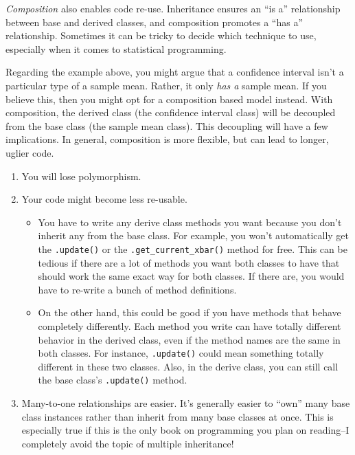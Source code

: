 \documentclass[12pt,krantz2]{krantz}
\begin{document}
\emph{Composition} also enables code re-use. Inheritance ensures an ``is a'' relationship between base and derived classes, and composition promotes a ``has a'' relationship. Sometimes it can be tricky to decide which technique to use, especially when it comes to statistical programming.

Regarding the example above, you might argue that a confidence interval isn't a particular type of a sample mean. Rather, it only \emph{has a} sample mean. If you believe this, then you might opt for a composition based model instead. With composition, the derived class (the confidence interval class) will be decoupled from the base class (the sample mean class). This decoupling will have a few implications. In general, composition is more flexible, but can lead to longer, uglier code.

\begin{enumerate}
\def\labelenumi{\arabic{enumi}.}
\item
  You will lose polymorphism.
\item
  Your code might become less re-usable.

  \begin{itemize}
  \item
    You have to write any derive class methods you want because you don't inherit any from the base class. For example, you won't automatically get the \texttt{.update()} or the \texttt{.get\_current\_xbar()} method for free. This can be tedious if there are a lot of methods you want both classes to have that should work the same exact way for both classes. If there are, you would have to re-write a bunch of method definitions.
  \item
    On the other hand, this could be good if you have methods that behave completely differently. Each method you write can have totally different behavior in the derived class, even if the method names are the same in both classes. For instance, \texttt{.update()} could mean something totally different in these two classes. Also, in the derive class, you can still call the base class's \texttt{.update()} method.
  \end{itemize}
\item
  Many-to-one relationships are easier. It's generally easier to ``own'' many base class instances rather than inherit from many base classes at once. This is especially true if this is the only book on programming you plan on reading--I completely avoid the topic of multiple inheritance!
\end{enumerate}
\end{document}
